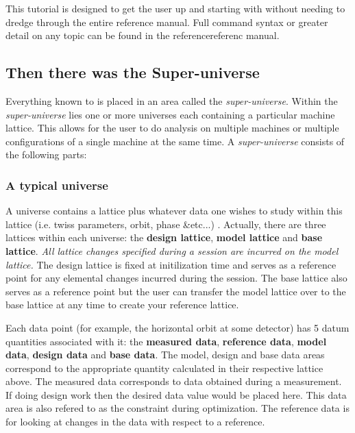 This tutorial is designed to get the user up and starting with \tao without
needing to dredge through the entire reference manual. Full command syntax
or greater detail on any topic can be found in the referencereferenc  manual.

\subsection{Then there was the Super-universe}

Everything known to \tao is placed in an area called the
\textit{super-universe}. Within the \textit{super-universe} lies one or more
universes each containing a particular machine lattice. This allows for the user
to do analysis on multiple machines or multiple configurations of a single
machine at the same time. A \textit{super-universe} consists of the following
parts:

\subsubsection{A typical universe}
A universe contains a \bmad lattice plus whatever data one wishes to study
within this lattice (i.e. twiss parameters, orbit, phase \&etc...) . Actually,
there are three lattices within each universe: the \textbf{design
lattice}, \textbf{model lattice} and \textbf{base lattice}. \emph{All lattice changes
specified during a \tao session are incurred on the model lattice.} The design lattice is
fixed at initilization time and serves as a reference point for any elemental
changes incurred during the \tao session. The base lattice also serves as a
reference point but the user can transfer the model lattice over to the base
lattice at any time to create your reference lattice.

Each data point (for example, the horizontal orbit at some detector) has 5 datum
 quantities associated with it: the \textbf{measured data}, \textbf{reference
data}, \textbf{model data}, \textbf{design data} and \textbf{base data}. The
model, design and base data areas correspond to the appropriate quantity
calculated in their respective lattice above. The measured data corresponds to 
data obtained during a measurement. If doing design work then the desired data
value would be placed here. This data area is also refered to as the constraint during
optimization. The reference data is for looking at changes in the data with
respect to a reference.

